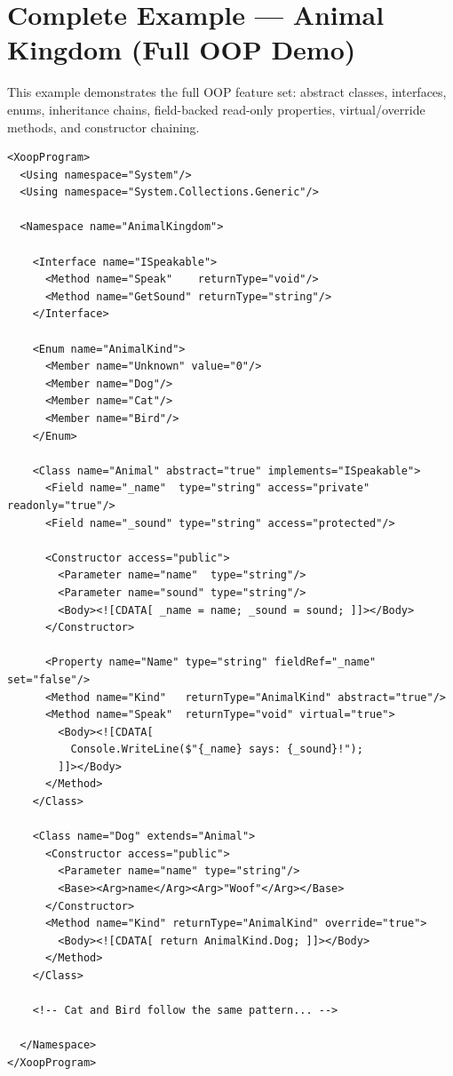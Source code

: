 \documentclass[11pt,a4paper]{article}
\begin{document}
\section{Complete Example — Animal Kingdom (Full OOP Demo)}

This example demonstrates the full OOP feature set: abstract classes,
interfaces, enums, inheritance chains, field-backed read-only properties,
virtual/override methods, and constructor chaining.

\begin{lstlisting}[caption={examples/animals.xoop (abridged)}]
<XoopProgram>
  <Using namespace="System"/>
  <Using namespace="System.Collections.Generic"/>

  <Namespace name="AnimalKingdom">

    <Interface name="ISpeakable">
      <Method name="Speak"    returnType="void"/>
      <Method name="GetSound" returnType="string"/>
    </Interface>

    <Enum name="AnimalKind">
      <Member name="Unknown" value="0"/>
      <Member name="Dog"/>
      <Member name="Cat"/>
      <Member name="Bird"/>
    </Enum>

    <Class name="Animal" abstract="true" implements="ISpeakable">
      <Field name="_name"  type="string" access="private"   readonly="true"/>
      <Field name="_sound" type="string" access="protected"/>

      <Constructor access="public">
        <Parameter name="name"  type="string"/>
        <Parameter name="sound" type="string"/>
        <Body><![CDATA[ _name = name; _sound = sound; ]]></Body>
      </Constructor>

      <Property name="Name" type="string" fieldRef="_name" set="false"/>
      <Method name="Kind"   returnType="AnimalKind" abstract="true"/>
      <Method name="Speak"  returnType="void" virtual="true">
        <Body><![CDATA[
          Console.WriteLine($"{_name} says: {_sound}!");
        ]]></Body>
      </Method>
    </Class>

    <Class name="Dog" extends="Animal">
      <Constructor access="public">
        <Parameter name="name" type="string"/>
        <Base><Arg>name</Arg><Arg>"Woof"</Arg></Base>
      </Constructor>
      <Method name="Kind" returnType="AnimalKind" override="true">
        <Body><![CDATA[ return AnimalKind.Dog; ]]></Body>
      </Method>
    </Class>

    <!-- Cat and Bird follow the same pattern... -->

  </Namespace>
</XoopProgram>
\end{lstlisting}
\end{document}
